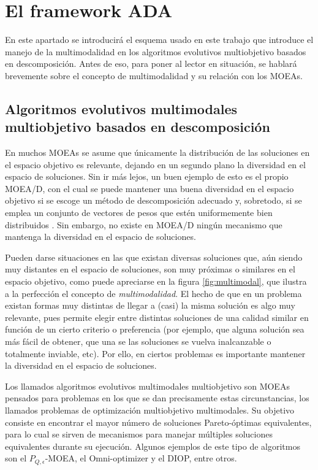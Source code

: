 \section{El framework ADA}

En este apartado se introducirá el esquema usado en este trabajo que introduce el manejo de la multimodalidad en los algoritmos evolutivos multiobjetivo basados en descomposición. Antes de eso, para poner al lector en situación, se hablará brevemente sobre el concepto de multimodalidad y su relación con los MOEAs.

\subsection{Algoritmos evolutivos multimodales multiobjetivo basados en descomposición}

En muchos MOEAs se asume que únicamente la distribución de las soluciones en el espacio objetivo es relevante, dejando en un segundo plano la diversidad en el espacio de soluciones. Sin ir más lejos, un buen ejemplo de esto es el propio MOEA/D, con el cual se puede mantener una buena diversidad en el espacio objetivo si se escoge un método de descomposición adecuado y, sobretodo, si se emplea un conjunto de vectores de pesos que estén uniformemente bien distribuidos \cite{zhang2007moea}. Sin embargo, no existe en MOEA/D ningún mecanismo que mantenga la diversidad en el espacio de soluciones.

Pueden darse situaciones en las que existan diversas soluciones que, aún siendo muy distantes en el espacio de soluciones, son muy próximas o similares en el espacio objetivo, como puede apreciarse en la figura \ref{fig:multimodal}, que ilustra a la perfección el concepto de \emph{multimodalidad}. El hecho de que en un problema existan formas muy distintas de llegar a (casi) la misma solución es algo muy relevante, pues permite elegir entre distintas soluciones de una calidad similar en función de un cierto criterio o preferencia (por ejemplo, que alguna solución sea más fácil de obtener, que una se las soluciones se vuelva inalcanzable o totalmente inviable, etc). Por ello, en ciertos problemas es importante mantener la diversidad en el espacio de soluciones.

Los llamados algoritmos evolutivos multimodales multiobjetivo son MOEAs pensados para problemas en los que se dan precisamente estas circunstancias, los llamados problemas de optimización multiobjetivo multimodales. Su objetivo consiste en encontrar el mayor número de soluciones Pareto-óptimas equivalentes, para lo cual se sirven de mecanismos para manejar múltiples soluciones equivalentes durante su ejecución. Algunos ejemplos de este tipo de algoritmos son el $P_{Q,\epsilon}$-MOEA, el Omni-optimizer y el DIOP, entre otros.


